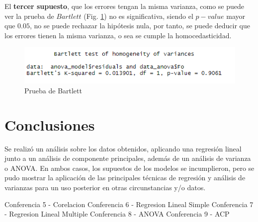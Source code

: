 \documentclass[a4paper,10pt,twocolumn]{article}
\begin{document}
El \textbf{tercer supuesto}, que los errores tengan la misma varianza, como se puede ver la prueba de $Bartlett$ (Fig. \ref{fig:anova_homo}) no es significativa, siendo el $p-value$ mayor que $0.05$, no se puede rechazar la hipótesis nula, por tanto, se puede deducir que los errores tienen la misma varianza, o sea se cumple la homocedasticidad.

\begin{figure}[htb]%
	\begin{center}
		\includegraphics[width=\linewidth]{anova_homo}
	\end{center}
	\caption{Prueba de Bartlett \label{fig:anova_homo}}%
\end{figure}

\section{Conclusiones}\label{sec:conc}

Se realizó un análisis sobre los datos obtenidos, aplicando una regresión lineal junto a un análisis de componente principales, además de un análisis de varianza o ANOVA. En ambos casos, los supuestos de los modelos se incumplieron, pero se pudo mostrar la aplicación de las principales técnicas de regresión y análisis de varianzas para un uso posterior en otras circunstancias y/o datos.

\begin{thebibliography}{99}
	 Conferencia 5 - Corelacion
	 Conferencia 6 - Regresion Lineal Simple
	 Conferencia 7 - Regresion Lineal Multiple
	 Conferencia 8 - ANOVA
	 Conferencia 9 - ACP
\end{thebibliography}


\label{end}
\end{document}
